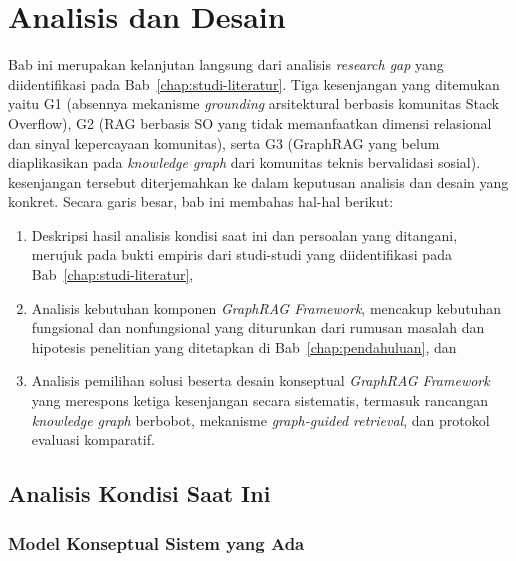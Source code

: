 
\chapter{Analisis dan Desain}
\label{chap:analisis-desain}

Bab ini merupakan kelanjutan langsung dari analisis \emph{research gap} yang diidentifikasi pada Bab~\ref{chap:studi-literatur}. Tiga kesenjangan yang ditemukan yaitu G1 (absennya mekanisme \emph{grounding} arsitektural berbasis komunitas Stack Overflow), G2 (RAG berbasis SO yang tidak memanfaatkan dimensi relasional dan sinyal kepercayaan komunitas), serta G3 (GraphRAG yang belum diaplikasikan pada \emph{knowledge graph} dari komunitas teknis bervalidasi sosial). kesenjangan tersebut diterjemahkan ke dalam keputusan analisis dan desain yang konkret. Secara garis besar, bab ini membahas hal-hal berikut:

\begin{enumerate}[1.]
    \item Deskripsi hasil analisis kondisi saat ini dan persoalan yang ditangani, merujuk pada bukti empiris dari studi-studi yang diidentifikasi pada Bab~\ref{chap:studi-literatur},

    \item Analisis kebutuhan komponen \emph{GraphRAG Framework}, mencakup kebutuhan fungsional dan nonfungsional yang diturunkan dari rumusan masalah dan hipotesis penelitian yang ditetapkan di Bab~\ref{chap:pendahuluan}, dan

    \item Analisis pemilihan solusi beserta desain konseptual \emph{GraphRAG Framework} yang merespons ketiga kesenjangan secara sistematis, termasuk rancangan \emph{knowledge graph} berbobot, mekanisme \emph{graph-guided retrieval}, dan protokol evaluasi komparatif.
\end{enumerate}


\section{Analisis Kondisi Saat Ini}
\label{sec:kondisi-saat-ini}

\subsection{Model Konseptual Sistem yang Ada}
\label{subsec:model-konseptual}

